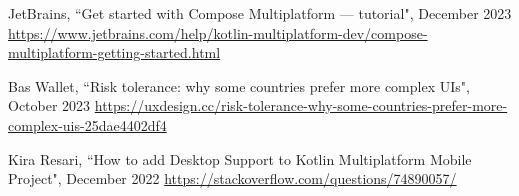 
\begin{thebibliography}{100}

 JetBrains, ``Get started with Compose Multiplatform — tutorial", December 2023
\href{https://www.jetbrains.com/help/kotlin-multiplatform-dev/compose-multiplatform-getting-started.html}{https://www.jetbrains.com/help/kotlin-multiplatform-dev/compose-multiplatform-getting-started.html}

  Bas Wallet, ``Risk tolerance: why some countries prefer more complex UIs", October 2023
\href{https://uxdesign.cc/risk-tolerance-why-some-countries-prefer-more-complex-uis-25dae4402df4}{https://uxdesign.cc/risk-tolerance-why-some-countries-prefer-more-complex-uis-25dae4402df4} 

  Kira Resari, ``How to add Desktop Support to Kotlin Multiplatform Mobile Project", December 2022
\href{https://stackoverflow.com/questions/74890057/}{https://stackoverflow.com/questions/74890057/}

\end{thebibliography}
